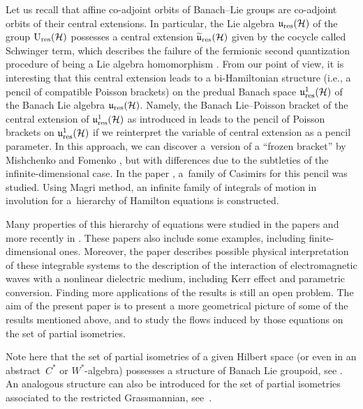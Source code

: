 \documentclass[10pt,a4paper]{amsart}
\theoremstyle{definition}
\numberwithin{equation}{section}
\renewcommand{\H}{\mathcal{H}}
\newcommand{\Ur}{\mathrm{U}_{\textnormal{res}}(\H)}
\newcommand{\ur}{\mathfrak u_{\textnormal{res}}(\H)}
\newcommand{\urp}{\mathfrak u_{\textnormal{res}}^1(\H)}
\newcommand{\urt}{\widetilde{\mathfrak u}_{\textnormal{res}}(\H)}
\begin{document}
Let us recall that affine co-adjoint orbits of Banach--Lie groups are co-adjoint orbits of their central extensions. In particular, the Lie algebra $\ur$ of the group $\Ur$ possesses a central extension $\urt$ given by the cocycle called Schwinger term, which describes the failure of the fermionic second quantization procedure of being a Lie algebra homomorphism \cite{mickelsson,schwinger,wurzbacher}. From our point of view, it is interesting that this central extension leads to a bi-Hamiltonian structure (i.e., a pencil of compatible Poisson brackets) on the predual Banach space $\urp$ of the Banach Lie algebra $\ur$. Namely, the Banach Lie--Poisson bracket of the central extension of $\urp$ as introduced in \cite{Ratiu-grass} leads to the pencil of Poisson brackets on $\urp$ if we reinterpret the variable of central extension as a pencil parameter. In this approach, we can discover a~version of a ``frozen bracket'' by Mishchenko and Fomenko \cite{fomenko-trofimov}, but with differences due to the subtleties of the infinite-dimensional case. In the paper \cite{GO-grass}, a~family of Casimirs for this pencil was studied. Using Magri method, an infinite family of integrals of motion in involution for a~hierarchy of Hamilton equations is constructed.

Many properties of this hierarchy of equations were studied in the papers \cite{GO-grass-bial,GO-grass,GO-grass2} and more recently in \cite{GT-partiso-bial}. These papers also include some examples, including finite-dimensional ones. Moreover, the paper \cite{GO-grass2} describes possible physical interpretation of these integrable systems to the description of the interaction of electromagnetic waves with a nonlinear dielectric medium, including Kerr effect and parametric conversion. Finding more applications of the results is still an open problem. The aim of the present paper is to present a more geometrical picture of some of the results mentioned above, and to study the flows induced by those equations on the set of partial isometries.

Note here that the set of partial isometries of a given Hilbert space (or even in an abstract~$C^*$ or $W^*$-algebra) possesses a structure of Banach Lie groupoid, see \cite{BGJP,OS}. An analogous structure can also be introduced for the set of partial isometries associated to the restricted Grassmannian, see~\cite{GJS-partiso}.
\end{document}
